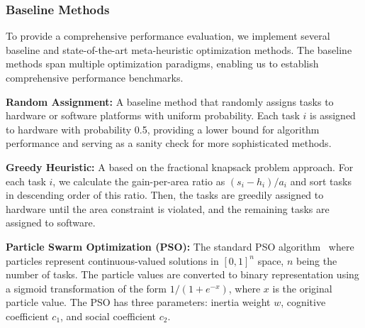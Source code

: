 
\subsubsection{Baseline Methods}
To provide a comprehensive performance evaluation, we implement several baseline and state-of-the-art meta-heuristic optimization methods. The baseline methods span multiple optimization paradigms, enabling us to establish comprehensive performance benchmarks.

\textbf{Random Assignment:} A baseline method that randomly assigns tasks to hardware or software platforms with uniform probability. Each task $i$ is assigned to hardware with probability 0.5, providing a lower bound for algorithm performance and serving as a sanity check for more sophisticated methods.

\textbf{Greedy Heuristic:} A based on the fractional knapsack problem approach. For each task $i$, we calculate the gain-per-area ratio as $(s_i - h_i)/a_i$ and sort tasks in descending order of this ratio. Then, the tasks are greedily assigned to hardware until the area constraint is violated, and the remaining tasks are assigned to software. 

\textbf{Particle Swarm Optimization (PSO):} The standard PSO algorithm~\cite{kennedy1995particle} where particles represent continuous-valued solutions in $[0,1]^n$ space, $n$ being the number of tasks. The particle values are converted to binary representation using a sigmoid transformation of the form $1/(1+e^{-x})$, where $x$ is the original particle value. The PSO has three parameters: inertia weight $w$, cognitive coefficient $c_1$, and social coefficient $c_2$.

